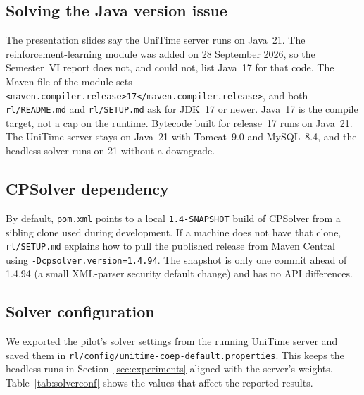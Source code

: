 \subsection{Solving the Java version issue}

The presentation slides say the UniTime server runs on Java~21. The reinforcement-learning module was added on 28 September 2026, so the Semester~VI report does not, and could not, list Java~17 for that code.
The Maven file of the module sets \texttt{<maven.compiler.release>17</maven.compiler.release>}, and both \texttt{rl/README.md} and \texttt{rl/SETUP.md} ask for JDK~17 or newer.
Java~17 is the compile target, not a cap on the runtime.
Bytecode built for release~17 runs on Java~21.
The UniTime server stays on Java~21 with Tomcat~9.0 and MySQL~8.4, and the headless solver runs on 21 without a downgrade.

\subsection{CPSolver dependency}

By default, \texttt{pom.xml} points to a local \texttt{1.4-SNAPSHOT} build of CPSolver from a sibling clone used during development.
If a machine does not have that clone, \texttt{rl/SETUP.md} explains how to pull the published release from Maven Central using \texttt{-Dcpsolver.version=1.4.94}.
The snapshot is only one commit ahead of 1.4.94 (a small XML-parser security default change) and has no API differences.

\subsection{Solver configuration}

We exported the pilot's solver settings from the running UniTime server and saved them in \texttt{rl/config/unitime-coep-default.properties}.
This keeps the headless runs in Section~\ref{sec:experiments} aligned with the server's weights.
Table~\ref{tab:solverconf} shows the values that affect the reported results.

